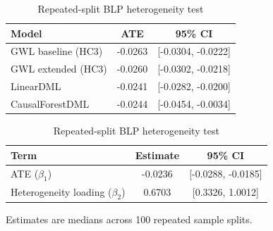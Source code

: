 \begin{table}[htbp]
\centering

\begin{minipage}[t]{0.48\textwidth}
\centering
\caption{Main estimation results}
\label{tab:main_results}
\footnotesize
\begin{tabular}{@{}lcc@{}}
\toprule
Model & ATE & 95\% CI \\
\midrule
GWL baseline (HC3) & -0.0263 & [-0.0304, -0.0222] \\
GWL extended (HC3) & -0.0260 & [-0.0302, -0.0218] \\
LinearDML & -0.0241 & [-0.0282, -0.0200] \\
CausalForestDML & -0.0244 & [-0.0454, -0.0034] \\
\bottomrule
\end{tabular}
\end{minipage}
\hfill
\begin{minipage}[t]{0.48\textwidth}
\centering
\begin{threeparttable}
\caption{Repeated-split BLP heterogeneity test}
\label{tab:blp_results}
\footnotesize
\begin{tabular}{@{}lcc@{}}
\toprule
Term & Estimate & 95\% CI \\
\midrule
ATE ($\beta_1$) & -0.0236 & [-0.0288, -0.0185] \\
Heterogeneity loading ($\beta_2$) & 0.6703 & [0.3326, 1.0012] \\
\bottomrule
\end{tabular}
\begin{tablenotes}[flushleft]
\footnotesize
\item Estimates are medians across 100 repeated sample splits.
\end{tablenotes}
\end{threeparttable}
\end{minipage}

\end{table}

